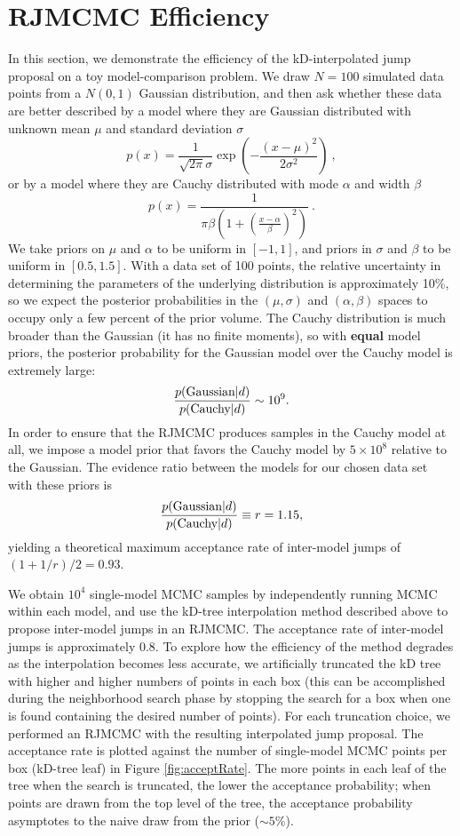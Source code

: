 \documentclass{iopart}
\newcommand{\be}{\begin{equation}}
\newcommand{\ee}{\end{equation}}
\newcommand{\ilya}[1]{{\color{red} \bf #1}}
\begin{document}
\section{RJMCMC Efficiency}
\label{sec:efficiency}

In this section, we demonstrate the efficiency of the kD-interpolated
jump proposal on a toy model-comparison problem.  We draw $N = 100$
simulated data points from a $N(0,1)$ Gaussian distribution, and then
ask whether these data are better described by a model where they are
Gaussian distributed with unknown mean $\mu$ and standard deviation
$\sigma$
%
\be
p(x) = \frac{1}{\sqrt{2\pi} \sigma} \exp\left( - \frac{(x-\mu)^2}{2
    \sigma^2} \right)\ ,
\ee
%
or by a model where they are Cauchy distributed with mode $\alpha$
and width $\beta$
%
\be
p(x) = \frac{1}{\pi \beta \left( 1 + \left(\frac{x - \alpha}{\beta}\right)^2\right)}\ .
\ee
%
We take priors on $\mu$ and $\alpha$ to be uniform in $[-1,1]$, and
priors in $\sigma$ and $\beta$ to be uniform in $[0.5, 1.5]$.  With a
data set of 100 points, the relative uncertainty in determining the
parameters of the underlying distribution is approximately 10\%, so we
expect the posterior probabilities in the $(\mu,\sigma)$ and
$(\alpha,\beta)$ spaces to occupy only a few percent of the prior
volume.  The Cauchy distribution is much broader than the Gaussian (it
has no finite moments), so with \ilya{equal} model priors, the posterior
probability for the Gaussian model over the Cauchy model is extremely
large:
%
\be
\frac{p(\textnormal{Gaussian} | d)}{p(\textnormal{Cauchy}|d)} \sim 10^9.
\ee
%
In order to ensure that the RJMCMC produces samples in the Cauchy
model at all, we impose a model prior that favors the Cauchy model by
$5 \times 10^8$ relative to the Gaussian.  The evidence ratio between
the models for our chosen data set with these priors is
%
\be \frac{p(\textnormal{Gaussian} | d)}{p(\textnormal{Cauchy}|d)}
\equiv r = 1.15,
\ee
%
yielding a theoretical maximum acceptance rate of inter-model jumps of
$(1+1/r)/2 = 0.93$.

We obtain $10^4$ single-model MCMC samples by independently running
MCMC within each model, and use the kD-tree interpolation method
described above to propose inter-model jumps in an RJMCMC.  The
acceptance rate of inter-model jumps is approximately 0.8.  To explore
how the efficiency of the method degrades as the interpolation becomes
less accurate, we artificially truncated the kD tree with higher and
higher numbers of points in each box (this can be accomplished during
the neighborhood search phase by stopping the search for a box when
one is found containing the desired number of points).  For each
truncation choice, we performed an RJMCMC with the resulting
interpolated jump proposal.  The acceptance rate is plotted against
the number of single-model MCMC points per box (kD-tree leaf) in
Figure \ref{fig:acceptRate}.  The more points in each leaf of the tree
when the search is truncated, the lower the acceptance probability;
when points are drawn from the top level of the tree, the acceptance
probability asymptotes to the naive draw from the prior ($\sim 5\%$).
\end{document}
